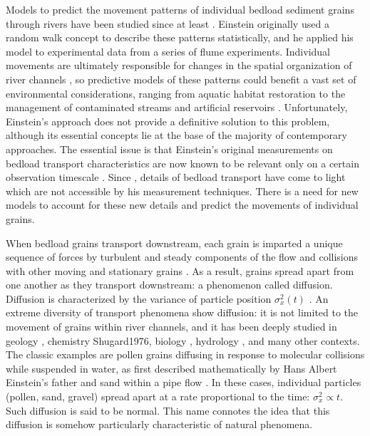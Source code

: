 \documentclass[]{agujournal2018}
\begin{document}
Models to predict the movement patterns of individual bedload sediment grains through rivers have been studied since at least \citet{Einstein1937}.
Einstein originally used a random walk concept to describe these patterns statistically, and he applied his model to experimental data from a series of flume experiments.
Individual movements are ultimately responsible for changes in the spatial organization of river channels \citep{Hassan2017}, so predictive models of these patterns could benefit a vast set of environmental considerations, ranging from aquatic habitat restoration \citep{Hauer2016} to the management of contaminated streams \citep{Macklin2006} and artificial reservoirs \citep{Schleiss2016}.
Unfortunately, Einstein's approach does not provide a definitive solution to this problem, although its essential concepts lie at the base of the majority of contemporary approaches.
The essential issue is that Einstein's original measurements on bedload transport characteristics are now known to be relevant only on a certain observation timescale \citep{Nikora2001a}.
Since \citet{Einstein1937}, details of bedload transport have come to light which are not accessible by his measurement techniques.
There is a need for new models to account for these new details and predict the movements of individual grains.

When bedload grains transport downstream, each grain is imparted a unique sequence of forces by turbulent and steady components of the flow \citep{} and collisions with other moving and stationary grains \citep{Gordon1972}. 
As a result, grains spread apart from one another as they transport downstream: a phenomenon called diffusion.
Diffusion is characterized by the variance of particle position $\sigma_x^2(t)$ \citep{Furbish2017}.
An extreme diversity of transport phenomena show diffusion: it is not limited to the movement of grains within river channels, and it has been deeply studied in geology \citep{Berkowitz2006}, chemistry {Shugard1976}, biology \citep{Sokolov2012}, hydrology \citep{Yang2019}, and many other contexts.
The classic examples are pollen grains diffusing in response to molecular collisions while suspended in water, as first described mathematically by Hans Albert Einstein's father \citep{Einstein1905} and sand within a pipe flow \citep{Taylor1920}.
In these cases, individual particles (pollen, sand, gravel) spread apart at a rate proportional to the time: $\sigma_x^2 \propto t$. Such diffusion is said to be normal.
This name connotes the idea that this diffusion is somehow particularly characteristic of natural phenomena.
\end{document}
